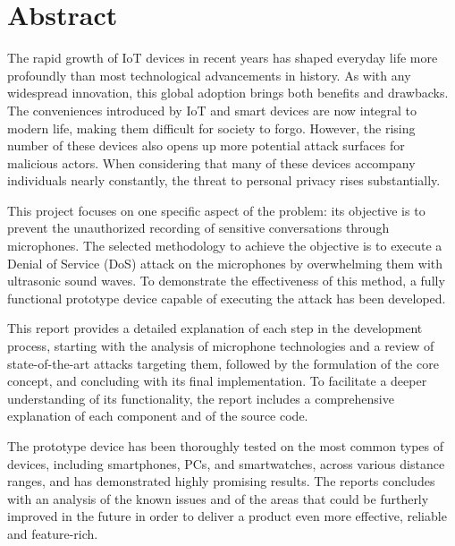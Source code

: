 \chapter*{Abstract}
The rapid growth of IoT devices in recent years has shaped everyday life more profoundly than most technological advancements in history. 
As with any widespread innovation, this global adoption brings both benefits and drawbacks. 
The conveniences introduced by IoT and smart devices are now integral to modern life, making them difficult for society to forgo. 
However, the rising number of these devices also opens up more potential attack surfaces for malicious actors. 
When considering that many of these devices accompany individuals nearly constantly, the threat to personal privacy rises substantially.

This project focuses on one specific aspect of the problem: its objective is to prevent the unauthorized recording of sensitive conversations through microphones.
The selected methodology to achieve the objective is to execute a Denial of Service (DoS) attack on the microphones by overwhelming them with ultrasonic sound waves.
To demonstrate the effectiveness of this method, a fully functional prototype device capable of executing the attack has been developed.

This report provides a detailed explanation of each step in the development process, starting with the analysis of microphone technologies and a review of state-of-the-art attacks targeting them, followed by the formulation of the core concept, and concluding with its final implementation.
To facilitate a deeper understanding of its functionality, the report includes a comprehensive explanation of each component and of the source code.

The prototype device has been thoroughly tested on the most common types of devices, including smartphones, PCs, and smartwatches, across various distance ranges, and has demonstrated highly promising results.
The reports concludes with an analysis of the known issues and of the areas that could be furtherly improved in the future in order to deliver a product even more effective, reliable and feature-rich.